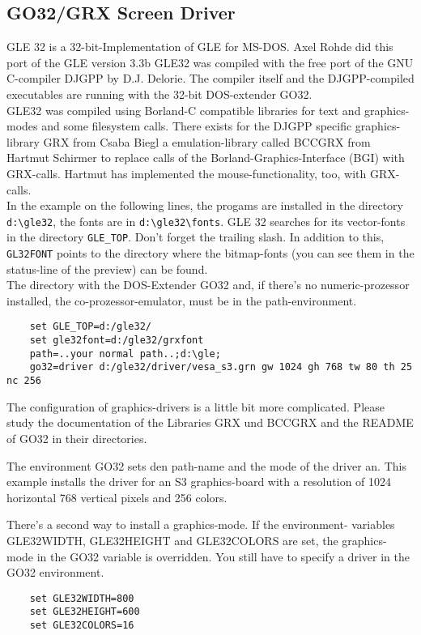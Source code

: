 \subsection{GO32/GRX Screen Driver}
GLE 32 is a 32-bit-Implementation of GLE for MS-DOS. 
Axel Rohde did this port of the GLE version 3.3b 
GLE32 was compiled with the free port 
of the GNU C-compiler DJGPP by D.J. Delorie. The compiler itself and 
the DJGPP-compiled executables are running with the 32-bit DOS-extender 
GO32.\\
%
GLE32 was compiled using Borland-C compatible libraries for text and 
graphics-modes and some filesystem calls. 
There exists for the DJGPP specific graphics-library GRX from Csaba Biegl 
a emulation-library called BCCGRX from Hartmut Schirmer 
to replace calls of the Borland-Graphics-Interface (BGI) with GRX-calls. 
Hartmut has implemented the mouse-functionality, too, with GRX-calls.\\
%
In the example on the following lines, the progams are installed in the 
directory \verb#d:\gle32#, the fonts are in \verb#d:\gle32\fonts#. 
GLE 32 searches for
its vector-fonts in the directory \verb#GLE_TOP#. Don't forget the trailing slash. 
In addition to this, \verb#GL32FONT# points to the directory where the bitmap-fonts 
(you can see them in the status-line of the preview) can be found. \\
%
The directory with the DOS-Extender GO32 and, if there's no 
numeric-prozessor installed, the co-prozessor-emulator, must be in the 
path-environment. 
\begin{verbatim}
    set GLE_TOP=d:/gle32/
    set gle32font=d:/gle32/grxfont
    path=..your normal path..;d:\gle;
    go32=driver d:/gle32/driver/vesa_s3.grn gw 1024 gh 768 tw 80 th 25 nc 256 
\end{verbatim}


The configuration of graphics-drivers is a little bit more complicated. 
Please study the documentation of the Libraries GRX und BCCGRX and 
the README of GO32 in their directories. 

The environment GO32 sets den path-name and the mode of the driver 
an. This example installs the driver for an S3 graphics-board with a 
resolution of 1024 horizontal 768 vertical pixels and 256 colors. 

There's a second way to install a graphics-mode. If the environment-
variables GLE32WIDTH, GLE32HEIGHT and GLE32COLORS are set, the graphics-
mode in the GO32 variable is overridden. You still have to specify a 
driver in the GO32 environment.
\begin{verbatim}   
    set GLE32WIDTH=800
    set GLE32HEIGHT=600
    set GLE32COLORS=16
\end{verbatim}

